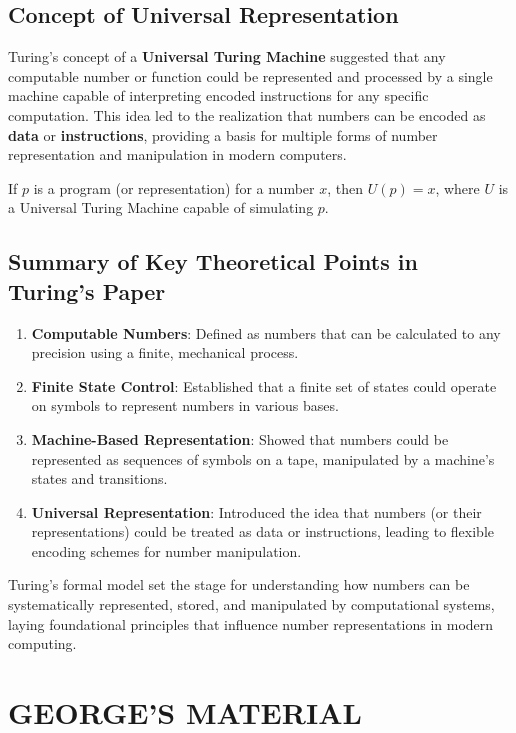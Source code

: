 \subsection{Concept of Universal Representation}

Turing’s concept of a \textbf{Universal Turing Machine} suggested that any computable number or function could be represented and processed by a single machine capable of interpreting encoded instructions for any specific computation. This idea led to the realization that numbers can be encoded as \textbf{data} or \textbf{instructions}, providing a basis for multiple forms of number representation and manipulation in modern computers.

If \( p \) is a program (or representation) for a number \( x \), then \( U(p) = x \), where \( U \) is a Universal Turing Machine capable of simulating \( p \).

\subsection{Summary of Key Theoretical Points in Turing's Paper}

\begin{enumerate}
    \item \textbf{Computable Numbers}: Defined as numbers that can be calculated to any precision using a finite, mechanical process.
    \item \textbf{Finite State Control}: Established that a finite set of states could operate on symbols to represent numbers in various bases.
    \item \textbf{Machine-Based Representation}: Showed that numbers could be represented as sequences of symbols on a tape, manipulated by a machine’s states and transitions.
    \item \textbf{Universal Representation}: Introduced the idea that numbers (or their representations) could be treated as data or instructions, leading to flexible encoding schemes for number manipulation.
\end{enumerate}

Turing’s formal model set the stage for understanding how numbers can be systematically represented, stored, and manipulated by computational systems, laying foundational principles that influence number representations in modern computing.


\section{GEORGE'S MATERIAL}

